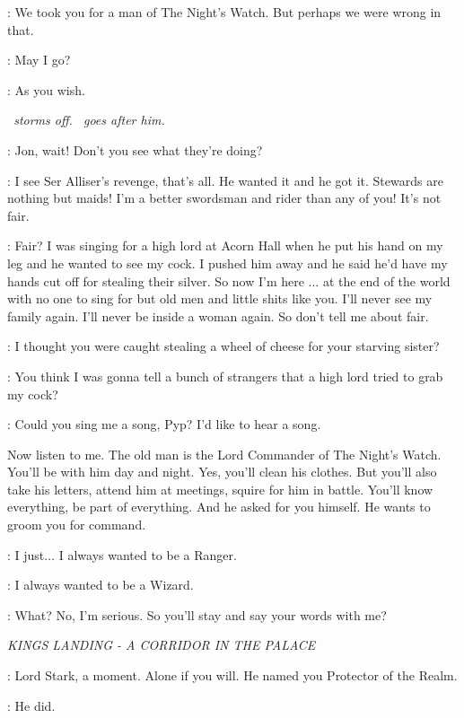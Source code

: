 \AEMON: We took you for a man of The Night's Watch. But perhaps we were wrong in that. 

\JON: May I go? 

\AEMON: As you wish. 

\textit{\JON ~storms off. \SAM ~goes after him.}

\SAM: Jon, wait! Don't you see what they're doing? 

\JON: I see Ser Alliser's revenge, that's all. He wanted it and he got it. Stewards are nothing but maids! I'm a better swordsman and rider than any of you! It's not fair. 

\PYP: Fair? I was singing for a high lord at Acorn Hall when he put his hand on my leg and he wanted to see my cock. I pushed him away and he said he'd have my hands cut off for stealing their silver. So now I'm here $\ldots$ at the end of the world with no one to sing for but old men and little shits like you. I'll never see my family again. I'll never be inside a woman again. So don't tell me about fair. 

\SAM: I thought you were caught stealing a wheel of cheese for your starving sister? 

\PYP: You think I was gonna tell a bunch of strangers that a high lord tried to grab my cock? 

\SAM: Could you sing me a song, Pyp? I'd like to hear a song.  

 Now listen to me. The old man is the Lord Commander of The Night's Watch. You'll be with him day and night. Yes, you'll clean his clothes. But you'll also take his letters, attend him at meetings, squire for him in battle. You'll know everything, be part of everything. And he asked for you himself. He wants to groom you for command. 

\JON: I just$\ldots$ I always wanted to be a Ranger. 

\SAM: I always wanted to be a Wizard. 


\SAM: What? No, I'm serious. So you'll stay and say your words with me? 


\scene

\textit{KINGS LANDING - A CORRIDOR IN THE PALACE} 


\RENLY: Lord Stark, a moment. Alone if you will.  He named you Protector of the Realm. 

\NED: He did. 

